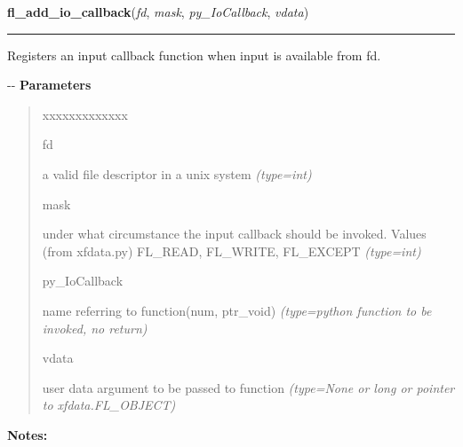     \label{xformslib:flbasic:fl_add_io_callback}

    \vspace{0.5ex}

\hspace{.8\funcindent}\begin{boxedminipage}{\funcwidth}

    \raggedright \textbf{fl\_add\_io\_callback}(\textit{fd}, \textit{mask}, \textit{py\_IoCallback}, \textit{vdata})

    \vspace{-1.5ex}

    \rule{\textwidth}{0.5\fboxrule}
\setlength{\parskip}{2ex}

Registers an input callback function when input is available from fd.

-{}-
\setlength{\parskip}{1ex}
      \textbf{Parameters}
      \vspace{-1ex}

      \begin{quote}
        \begin{Ventry}{xxxxxxxxxxxxx}

          \item[fd]


a valid file descriptor in a unix system
            {\it (type=int)}

          \item[mask]


under what circumstance the input callback should be invoked. Values
(from xfdata.py) FL\_READ, FL\_WRITE, FL\_EXCEPT
            {\it (type=int)}

          \item[py\_IoCallback]


name referring to function(num, ptr\_void)
            {\it (type=python function to be invoked, no return)}

          \item[vdata]


user data argument to be passed to function
            {\it (type=None or long or pointer to xfdata.FL\_OBJECT)}

        \end{Ventry}

      \end{quote}

\textbf{Notes:}
\begin{quote}
  \begin{itemize}


\end{itemize}
\end{quote}
\end{boxedminipage}
